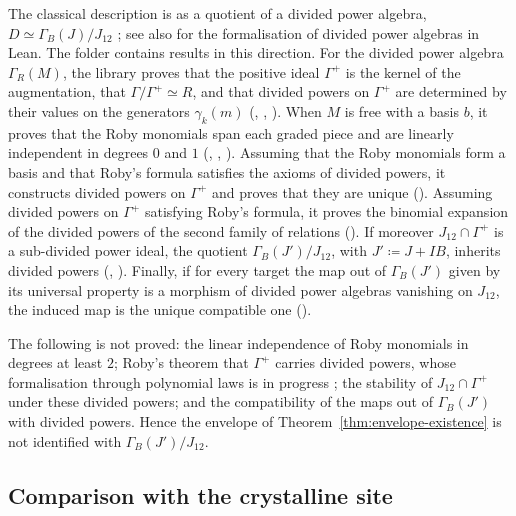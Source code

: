 \documentclass[11pt]{amsart}
\newcommand{\spa}{\medskip}
\theoremstyle{plain}
\theoremstyle{definition}
\theoremstyle{remark}
\begin{document}
The classical description is as a quotient of a divided power algebra, $D \simeq \Gamma_B(J)/J_{12}$ \cite{berthelot-ogus,roby65}; see also \cite{cl-df,cl-df-laws} for the formalisation of divided power algebras in Lean. The folder  contains results in this direction. For the divided power algebra $\Gamma_R(M)$, the library proves that the positive ideal $\Gamma^+$ is the kernel of the augmentation, that $\Gamma/\Gamma^+ \simeq R$, and that divided powers on $\Gamma^+$ are determined by their values on the generators $\gamma_k(m)$ (, , ). When $M$ is free with a basis $b$, it proves that the Roby monomials \cite{roby63} span each graded piece and are linearly independent in degrees $0$ and $1$ (, , ). Assuming that the Roby monomials form a basis and that Roby's formula satisfies the axioms of divided powers, it constructs divided powers on $\Gamma^+$ and proves that they are unique (). Assuming divided powers on $\Gamma^+$ satisfying Roby's formula, it proves the binomial expansion of the divided powers of the second family of relations (). If moreover $J_{12} \cap \Gamma^+$ is a sub-divided power ideal, the quotient $\Gamma_B(J')/J_{12}$, with $J' \coloneqq J + IB$, inherits divided powers (, ). Finally, if for every target the map out of $\Gamma_B(J')$ given by its universal property is a morphism of divided power algebras vanishing on $J_{12}$, the induced map is the unique compatible one ().

\spa

The following is not proved: the linear independence of Roby monomials in degrees at least $2$; Roby's theorem that $\Gamma^+$ carries divided powers, whose formalisation through polynomial laws is in progress \cite{cl-df-laws}; the stability of $J_{12} \cap \Gamma^+$ under these divided powers; and the compatibility of the maps out of $\Gamma_B(J')$ with divided powers. Hence the envelope of Theorem~\ref{thm:envelope-existence} is not identified with $\Gamma_B(J')/J_{12}$.

\subsection{Comparison with the crystalline site}
\end{document}
